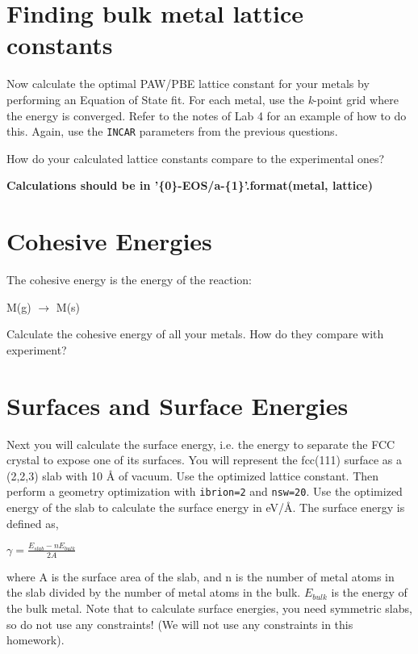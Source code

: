 \documentclass[11pt]{article}
\begin{document}
\section{Finding bulk metal lattice constants}
\label{sec:orga74fb7f}

Now calculate the optimal PAW/PBE lattice constant for your metals by performing an Equation of State fit. For each metal, use the \emph{k}-point grid where the energy is converged. Refer to the notes of Lab 4 for an example of how to do this. Again, use the \texttt{INCAR} parameters from the previous questions. 

How do your calculated lattice constants compare to the experimental ones?

\textbf{Calculations should be in '\{0\}-EOS/a-\{1\}'.format(metal, lattice)}

\section{Cohesive Energies}
\label{sec:org8cf42c1}

The cohesive energy is the energy of the reaction:

M(g) \(\rightarrow\) M(s)

Calculate the cohesive energy of all your metals. How do they compare with experiment?

\section{Surfaces and Surface Energies}
\label{sec:orgb09a92c}

Next you will calculate the surface energy, i.e. the energy to separate the FCC crystal to expose one of its surfaces. You will represent the fcc(111) surface as a (2,2,3) slab with 10 \AA{} of vacuum. Use the optimized lattice constant. Then perform a geometry optimization with \texttt{ibrion=2} and \texttt{nsw=20}. 
Use the optimized energy of the slab to calculate the surface energy in eV/\AA{}. The surface energy is defined as,

\(\gamma = \frac{E_{slab} - nE_{bulk}}{2A}\)

where A is the surface area of the slab, and n is the number of metal atoms in the slab divided by the number of metal atoms in the bulk. \(E_{bulk}\) is the energy of the bulk metal. Note that to calculate surface energies, you need symmetric slabs, so do not use any constraints! (We will not use any constraints in this homework).
\end{document}

